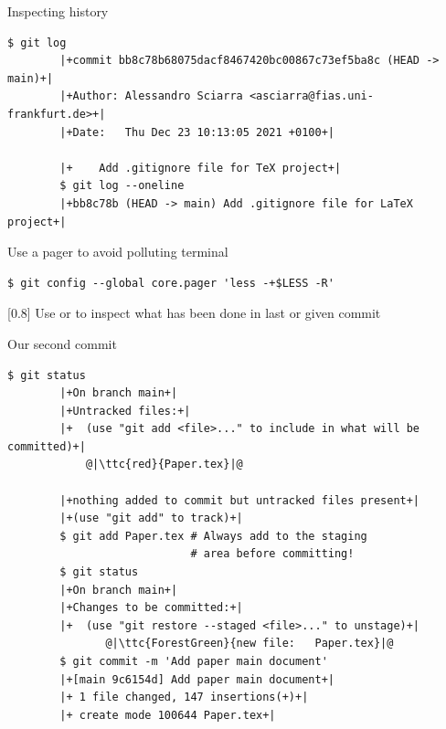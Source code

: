 \documentclass[usenames,svgnames,14pt]{beamer}
\newcommand{\ttc}[2]{\texttt{\textcolor{#1}{#2}}}
\begin{document}
\begin{frame}[fragile]{Inspecting history}
    \begin{lstlisting}[style=MyBash, belowskip=-4mm]
        $ git log
        |+commit bb8c78b68075dacf8467420bc00867c73ef5ba8c (HEAD -> main)+|
        |+Author: Alessandro Sciarra <asciarra@fias.uni-frankfurt.de>+|
        |+Date:   Thu Dec 23 10:13:05 2021 +0100+|

        |+    Add .gitignore file for TeX project+|
        $ git log --oneline
        |+bb8c78b (HEAD -> main) Add .gitignore file for LaTeX project+|
    \end{lstlisting}
    \centerline{Use a pager to avoid polluting terminal}
    \begin{lstlisting}[style=MyBash, aboveskip=2mm]
        $ git config --global core.pager 'less -+$LESS -R'
    \end{lstlisting}
    \medskip
    \begin{varblock}{}[0.8\textwidth]{}
        Use \;\; or \;\; to inspect what has been done in last or given commit
    \end{varblock}
\end{frame}
\begin{frame}[fragile]{Our second commit}
    \begin{lstlisting}[style=MyBash]
        $ git status
        |+On branch main+|
        |+Untracked files:+|
        |+  (use "git add <file>..." to include in what will be committed)+|
            @|\ttc{red}{Paper.tex}|@

        |+nothing added to commit but untracked files present+|
        |+(use "git add" to track)+|
        $ git add Paper.tex # Always add to the staging
                            # area before committing!
        $ git status
        |+On branch main+|
        |+Changes to be committed:+|
        |+  (use "git restore --staged <file>..." to unstage)+|
               @|\ttc{ForestGreen}{new file:   Paper.tex}|@
        $ git commit -m 'Add paper main document'
        |+[main 9c6154d] Add paper main document+|
        |+ 1 file changed, 147 insertions(+)+|
        |+ create mode 100644 Paper.tex+|
    \end{lstlisting}
\end{frame}
\end{document}
